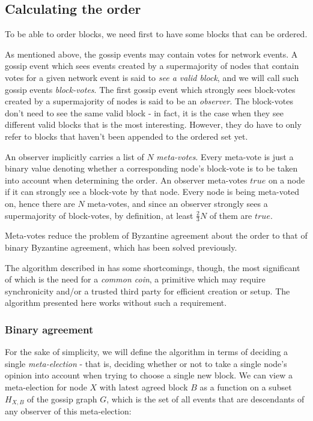\documentclass[a4paper,fleqn]{article}
\begin{document}
\subsection{Calculating the order}

To be able to order blocks, we need first to have some blocks that can be ordered.

As mentioned above, the gossip events may contain votes for network events. A gossip event which
sees events created by a supermajority of nodes that contain votes for a given network event is
said to \emph{see a valid block}, and we will call such gossip events \emph{block-votes}. The first
gossip event which strongly sees block-votes created by a supermajority of nodes is said to be an
\emph{observer}. The block-votes don't need to see the same valid block - in fact, it is the case
when they see different valid blocks that is the most interesting. However, they do have to only
refer to blocks that haven't been appended to the ordered set yet.

An observer implicitly carries a list of $N$ \emph{meta-votes}. Every meta-vote is just a binary
value denoting whether a corresponding node's block-vote is to be taken into account when
determining the order. An observer meta-votes $true$ on a node if it can strongly see a block-vote
by that node. Every node is being meta-voted on, hence there are $N$ meta-votes, and since an
observer strongly sees a supermajority of block-votes, by definition, at least $\frac{2}{3}N$ of
them are $true$.

Meta-votes reduce the problem of Byzantine agreement about the order to that of binary Byzantine
agreement, which has been solved previously\cite{aba}.

The algorithm described in \cite{aba} has some shortcomings, though, the most significant of which
is the need for a \emph{common coin}, a primitive which may require synchronicity and/or a trusted
third party for efficient creation or setup. The algorithm presented here works without such a
requirement.

\subsubsection{Binary agreement}

For the sake of simplicity, we will define the algorithm in terms of deciding a single
\emph{meta-election} - that is, deciding whether or not to take a single node's opinion into
account when trying to choose a single new block. We can view a meta-election for node $X$ with
latest agreed block $B$ as a function on a subset $H_{X,B}$ of the gossip graph $G$, which is the
set of all events that are descendants of any observer of this meta-election:
\end{document}
